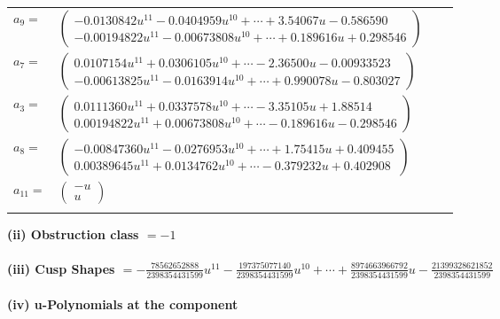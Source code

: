 \documentclass[1p]{elsarticle_modified}
\theoremstyle{definition}
\begin{document}
\begin{tabular}{m{7pt} m{180pt} m{7pt} m{180pt} }
\flushright $a_{9}=$&$\begin{pmatrix}-0.0130842 u^{11}-0.0404959 u^{10}+\cdots+3.54067 u-0.586590\\-0.00194822 u^{11}-0.00673808 u^{10}+\cdots+0.189616 u+0.298546\end{pmatrix}$ \\
\flushright $a_{7}=$&$\begin{pmatrix}0.0107154 u^{11}+0.0306105 u^{10}+\cdots-2.36500 u-0.00933523\\-0.00613825 u^{11}-0.0163914 u^{10}+\cdots+0.990078 u-0.803027\end{pmatrix}$ \\
\flushright $a_{3}=$&$\begin{pmatrix}0.0111360 u^{11}+0.0337578 u^{10}+\cdots-3.35105 u+1.88514\\0.00194822 u^{11}+0.00673808 u^{10}+\cdots-0.189616 u-0.298546\end{pmatrix}$ \\
\flushright $a_{8}=$&$\begin{pmatrix}-0.00847360 u^{11}-0.0276953 u^{10}+\cdots+1.75415 u+0.409455\\0.00389645 u^{11}+0.0134762 u^{10}+\cdots-0.379232 u+0.402908\end{pmatrix}$ \\
\flushright $a_{11}=$&$\begin{pmatrix}- u\\u\end{pmatrix}$\\&\end{tabular}
\flushleft \textbf{(ii) Obstruction class $= -1$}\\~\\
\flushleft \textbf{(iii) Cusp Shapes $= -\frac{78562652888}{2398354431599} u^{11}-\frac{197375077140}{2398354431599} u^{10}+\cdots+\frac{8974663966792}{2398354431599} u-\frac{21399328621852}{2398354431599}$}\\~\\
\newpage\renewcommand{\arraystretch}{1}
\flushleft \textbf{(iv) u-Polynomials at the component}\newline \\
\end{document}
